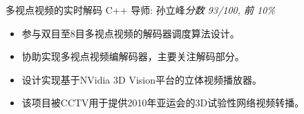 \documentclass[11pt,a4paper]{moderncv/moderncv}
\begin{document}
{多视点视频的实时解码}
{C++}
{导师: 孙立峰}{\textit{分数 93/100, 前 10\%}}
{
\begin{itemize}
	\item 参与双目至8目多视点视频的解码器调度算法设计。
	\item 协助实现多视点视频编解码器，主要关注解码部分。
	\item 设计实现基于NVidia 3D Vision平台的立体视频播放器。
	\item 该项目被CCTV用于提供2010年亚运会的3D试验性网络视频转播。
\end{itemize}
}
% 
% 
% 
% 
\end{document}

